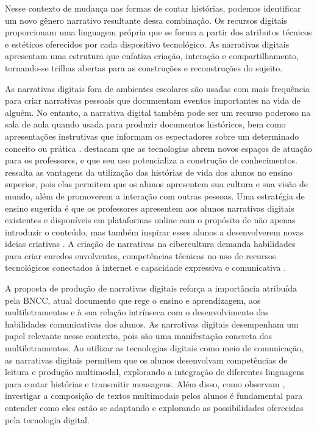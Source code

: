 \documentclass[portuguese]{textolivre}
\begin{document}
Nesse contexto de mudança nas formas de contar histórias, podemos identificar um novo gênero narrativo resultante dessa combinação. Os recursos digitais proporcionam uma linguagem própria que se forma a partir dos atributos técnicos e estéticos oferecidos por cada dispositivo tecnológico. As narrativas digitais apresentam uma estrutura que enfatiza criação, interação e compartilhamento, tornando-se trilhas abertas para as construções e reconstruções do sujeito.

As narrativas digitais fora de ambientes escolares são usadas com mais frequência para criar narrativas pessoais que documentam eventos importantes na vida de alguém. No entanto, a narrativa digital também pode ser um recurso poderoso na sala de aula quando usada para produzir documentos históricos, bem como apresentações instrutivas que informam os espectadores sobre um determinado conceito ou prática \cite{robin2008}. \textcite{santos2014webquest} destacam que as tecnologias abrem novos espaços de atuação para os professores, e que seu uso potencializa a construção de conhecimentos. \textcite{robin2012} ressalta as vantagens da utilização das histórias de vida dos alunos no ensino superior, pois elas permitem que os alunos apresentem sua cultura e sua visão de mundo, além de promoverem a interação com outras pessoas. Uma estratégia de ensino sugerida é que os professores apresentem aos alunos narrativas digitais existentes e disponíveis em plataformas online com o propósito de não apenas introduzir o conteúdo, mas também inspirar esses alunos a desenvolverem novas ideias criativas \cite{robin2012}. A criação de narrativas na cibercultura demanda habilidades para criar enredos envolventes, competências técnicas no uso de recursos tecnológicos conectados à internet e capacidade expressiva e comunicativa \cite{conceiçãodos2018narrate}.

A proposta de produção de narrativas digitais reforça a importância atribuída pela BNCC, atual documento que rege o ensino e aprendizagem, aos multiletramentos e à sua relação intrínseca com o desenvolvimento das habilidades comunicativas dos alunos. As narrativas digitais desempenham um papel relevante nesse contexto, pois são uma manifestação concreta dos multiletramentos. Ao utilizar as tecnologias digitais como meio de comunicação, as narrativas digitais permitem que os alunos desenvolvam competências de leitura e produção multimodal, explorando a integração de diferentes linguagens para contar histórias e transmitir mensagens. Além disso, como observam \textcite{jewitt2003multimodal}, investigar a composição de textos multimodais pelos alunos é fundamental para entender como eles estão se adaptando e explorando as possibilidades oferecidas pela tecnologia digital.
\end{document}

